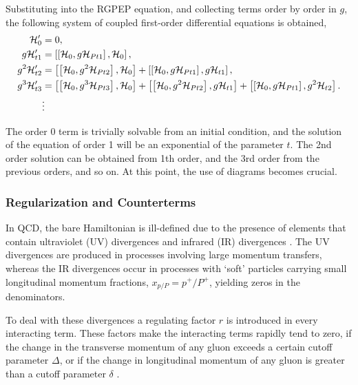 \documentclass[11pt,a4paper,twoside,pdf]{article}
\numberwithin{equation}{section}
\begin{document}
Substituting into the RGPEP equation, and collecting terms order by order in \( g \),
the following system of coupled first-order differential equations is obtained,
\begin{align}
        \mathcal{H}_{0}^\prime &= 0, \label{eq:diff_order0}\\
        g\mathcal{H}_{t 1}^\prime &= \left[ \left[ \mathcal{H}_0, g\mathcal{H}_{Pt 1} \right], 
        \mathcal{H}_{0} \right], \label{eq:diff_order1}\\
        g^2\mathcal{H}_{t 2}^\prime &= \left[ \left[ \mathcal{H}_0, g^2\mathcal{H}_{Pt 2} \right], 
        \mathcal{H}_{0} \right] + \left[ \left[ \mathcal{H}_0, g\mathcal{H}_{Pt 1} \right], 
        g\mathcal{H}_{t 1} \right], \\
        g^3\mathcal{H}_{t 3}^\prime &= \left[ \left[ \mathcal{H}_0, g^3\mathcal{H}_{Pt 3} \right], 
        \mathcal{H}_{0} \right] + \left[ \left[ \mathcal{H}_0, g^2\mathcal{H}_{Pt 2} \right], 
        g\mathcal{H}_{t 1} \right] + \left[ \left[ \mathcal{H}_0, g\mathcal{H}_{Pt 1} \right], 
        g^2\mathcal{H}_{t 2} \right]. \label{eq:diff_order3}\\
        &\vdots \nonumber
\end{align}

The order 0 term is trivially solvable from an initial condition, and the solution of the 
equation of order 1 will be an exponential of the parameter $t$. The 2nd order 
solution can be obtained from 1th order, and the 3rd order from the previous orders, 
and so on. At this point, the use of diagrams becomes crucial.


\subsubsection{Regularization and Counterterms}\label{sec:regulatrization_countertems}

In QCD, the bare Hamiltonian is ill-defined due to the presence of elements 
that contain ultraviolet (UV) divergences and infrared (IR) divergences
\cite{QCDG,glazek_renormalization_1993}.
The UV divergences are produced in processes involving large momentum transfers, 
whereas the IR divergences occur in processes with ‘soft’ particles carrying small 
longitudinal momentum fractions, $x_{p/P} = p^+/P^+$, yielding zeros in the 
denominators.

To deal with these divergences a regulating factor $r$ is 
introduced in every interacting term. These factors make the interacting terms rapidly 
tend to zero, if the change in the transverse momentum of any gluon exceeds a certain
cutoff parameter $\Delta$, or if the change in longitudinal momentum of any gluon is
greater than a cutoff parameter $\delta$ \cite{Collins_1984}. 
\end{document}
